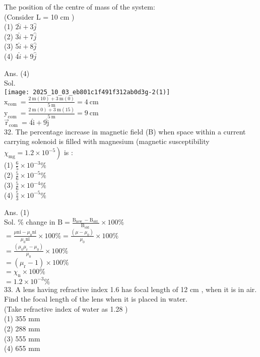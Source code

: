\documentclass[10pt]{article}
\begin{document}
The position of the centre of mass of the system:\\
(Consider L = 10 cm )\\
(1) \(2 \hat{i}+3 \hat{j}\)\\
(2) \(3 \hat{i}+7 \hat{j}\)\\
(3) \(5 \hat{i}+8 \hat{j}\)\\
(4) \(4 \hat{i}+9 \hat{j}\)

Ans. (4)\\
Sol.\\
\texttt{[image: 2025\_10\_03\_eb801c1f491f312ab0d3g-2(1)]}\\
\(\mathrm{x}_{\text {com }}=\frac{2 \mathrm{~m}(10)+3 \mathrm{~m}(0)}{5 \mathrm{~m}}=4 \mathrm{~cm}\)\\
\(\mathrm{y}_{\text {com }}=\frac{2 \mathrm{~m}(0)+3 \mathrm{~m}(15)}{5 \mathrm{~m}}=9 \mathrm{~cm}\)\\
\(\overrightarrow{\mathrm{r}}_{\text {com }}=4 \hat{\mathrm{i}}+9 \hat{\mathrm{j}}\)\\
32. The percentage increase in magnetic field (B) when space within a current carrying solenoid is filled with magnesium (magnetic susceptibility \(\left.\chi_{\mathrm{mg}}=1.2 \times 10^{-5}\right)\) is :\\
(1) \(\frac{6}{5} \times 10^{-3} \%\)\\
(2) \(\frac{5}{6} \times 10^{-5} \%\)\\
(3) \(\frac{5}{6} \times 10^{-4} \%\)\\
(4) \(\frac{5}{3} \times 10^{-5} \%\)

Ans. (1)\\
Sol. \% change in \(\mathrm{B}=\frac{\mathrm{B}_{\text {new }}-\mathrm{B}_{\text {old }}}{\mathrm{B}_{\text {old }}} \times 100 \%\)\\
\(=\frac{\mu \mathrm{ni}-\mu_{0} \mathrm{ni}}{\mu_{0} \mathrm{ni}} \times 100 \%=\frac{\left(\mu-\mu_{0}\right)}{\mu_{0}} \times 100 \%\)\\
\(=\frac{\left(\mu_{0} \mu_{\mathrm{r}}-\mu_{0}\right)}{\mu_{0}} \times 100 \%\)\\
\(=\left(\mu_{\mathrm{r}}-1\right) \times 100 \%\)\\
\(=\chi_{\mathrm{n}} \times 100 \%\)\\
\(=1.2 \times 10^{-3} \%\)\\
33. A lens having refractive index 1.6 has focal length of 12 cm , when it is in air. Find the focal length of the lens when it is placed in water.\\
(Take refractive index of water as 1.28 )\\
(1) 355 mm\\
(2) 288 mm\\
(3) 555 mm\\
(4) 655 mm
\end{document}
